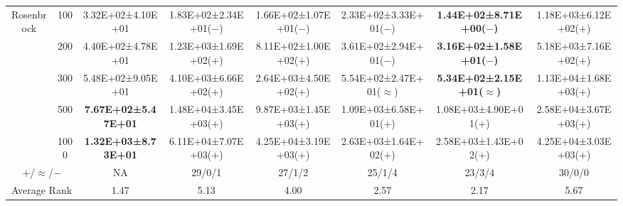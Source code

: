 \begin{tabular}{|cc|c|c|c|c|c|c|}
\multicolumn{1}{|c|}{\multirow{5}{*}{Rosenbrock}} & 100       & 3.32E+02±4.10E+01          & 1.83E+02±2.34E+01($-$) & 1.66E+02±1.07E+01($-$)       & 2.33E+02±3.33E+01($-$)       & \textbf{1.44E+02±8.71E+00($-$)}       & 1.18E+03±6.12E+02($+$) \\ \cline{2-8} 
\multicolumn{1}{|c|}{}                            & 200       & 4.40E+02±4.78E+01          & 1.23E+03±1.69E+02($+$) & 8.11E+02±1.00E+02($+$)       & 3.61E+02±2.94E+01($-$)       & \textbf{3.16E+02±1.58E+01($-$)}       & 5.18E+03±7.16E+02($+$) \\ \cline{2-8} 
\multicolumn{1}{|c|}{}                            & 300       & 5.48E+02±9.05E+01          & 4.10E+03±6.66E+02($+$) & 2.64E+03±4.50E+02($+$)       & 5.54E+02±2.47E+01($\approx$) & \textbf{5.34E+02±2.15E+01($\approx$)} & 1.13E+04±1.68E+03($+$) \\ \cline{2-8} 
\multicolumn{1}{|c|}{}                            & 500       & \textbf{7.67E+02±5.47E+01} & 1.48E+04±3.45E+03($+$) & 9.87E+03±1.45E+03($+$)       & 1.09E+03±6.58E+01($+$)       & 1.08E+03±4.90E+01($+$)                & 2.58E+04±3.67E+03($+$) \\ \cline{2-8} 
\multicolumn{1}{|c|}{}                            & 1000      & \textbf{1.32E+03±8.73E+01} & 6.11E+04±7.07E+03($+$) & 4.25E+04±3.19E+03($+$)       & 2.63E+03±1.64E+02($+$)       & 2.58E+03±1.43E+02($+$)                & 4.25E+04±3.03E+03($+$) \\ \hline
\multicolumn{2}{|c|}{$+$/$\approx$/$-$}                       & NA                         & 29/0/1                 & 27/1/2                       & 25/1/4                       & 23/3/4                                & 30/0/0                 \\ \hline
\multicolumn{2}{|c|}{Average Rank}                            & 1.47                       & 5.13                   & 4.00                         & 2.57                         & 2.17                                  & 5.67                   \\ \hline
\end{tabular}
